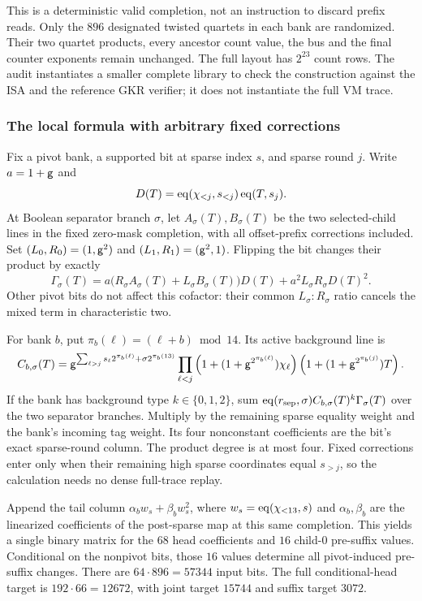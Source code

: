 This is a deterministic valid completion, not an instruction to discard prefix reads. Only the $896$ designated twisted quartets in each bank are randomized. Their two quartet products, every ancestor count value, the bus and the final counter exponents remain unchanged. The full layout has $2^{23}$ count rows. The audit instantiates a smaller complete library to check the construction against the ISA and the reference GKR verifier; it does not instantiate the full VM trace.

\subsubsection{The local formula with arbitrary fixed corrections}

Fix a pivot bank, a supported bit at sparse index $s$, and sparse round $j$. Write $a=1+\mathsf{g}$ and
\[
 D(T)=\operatorname{eq}(\chi_{<j},s_{<j})\operatorname{eq}(T,s_j).
\]
At Boolean separator branch $\sigma$, let $A_\sigma(T),B_\sigma(T)$ be the two selected-child lines in the fixed zero-mask completion, with all offset-prefix corrections included. Set $(L_0,R_0)=(1,\mathsf{g}^2)$ and $(L_1,R_1)=(\mathsf{g}^2,1)$. Flipping the bit changes their product by exactly
\[
 \Gamma_\sigma(T)
 =a\bigl(R_\sigma A_\sigma(T)+L_\sigma B_\sigma(T)\bigr)D(T)
  +a^2L_\sigma R_\sigma D(T)^2.
\]
Other pivot bits do not affect this cofactor: their common $L_\sigma:R_\sigma$ ratio cancels the mixed term in characteristic two.

For bank $b$, put $\pi_b(\ell)=(\ell+b)\bmod14$. Its active background line is
\[
 C_{b,\sigma}(T)=
 \mathsf{g}^{\sum_{\ell>j}s_\ell2^{\pi_b(\ell)}+\sigma2^{\pi_b(13)}}
 \prod_{\ell<j}\left(1+(1+\mathsf{g}^{2^{\pi_b(\ell)}})\chi_\ell\right)
 \left(1+(1+\mathsf{g}^{2^{\pi_b(j)}})T\right).
\]
If the bank has background type $k\in\{0,1,2\}$, sum $\operatorname{eq}(r_{\rm sep},\sigma)C_{b,\sigma}(T)^k\Gamma_\sigma(T)$ over the two separator branches. Multiply by the remaining sparse equality weight and the bank's incoming tag weight. Its four nonconstant coefficients are the bit's exact sparse-round column. The product degree is at most four. Fixed corrections enter only when their remaining high sparse coordinates equal $s_{>j}$, so the calculation needs no dense full-trace replay.

Append the tail column $\alpha_bw_s+\beta_bw_s^2$, where $w_s=\operatorname{eq}(\chi_{<13},s)$ and $\alpha_b,\beta_b$ are the linearized coefficients of the post-sparse map at this same completion. This yields a single binary matrix for the $68$ head coefficients and $16$ child-$0$ pre-suffix values. Conditional on the nonpivot bits, those $16$ values determine all pivot-induced pre-suffix changes. There are $64\cdot896=57344$ input bits. The full conditional-head target is $192\cdot66=12672$, with joint target $15744$ and suffix target $3072$.


